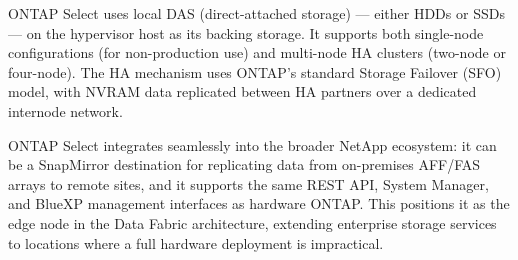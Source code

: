 ONTAP Select uses local DAS (direct-attached storage) --- either HDDs or SSDs --- on the hypervisor host as its backing storage. It supports both single-node configurations (for non-production use) and multi-node HA clusters (two-node or four-node). The HA mechanism uses ONTAP's standard Storage Failover (SFO) model, with NVRAM data replicated between HA partners over a dedicated internode network.

ONTAP Select integrates seamlessly into the broader NetApp ecosystem: it can be a SnapMirror destination for replicating data from on-premises AFF/FAS arrays to remote sites, and it supports the same REST API, System Manager, and BlueXP management interfaces as hardware ONTAP. This positions it as the edge node in the Data Fabric architecture, extending enterprise storage services to locations where a full hardware deployment is impractical.


